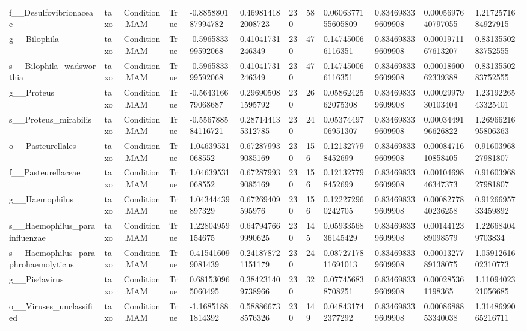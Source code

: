 \begin{longtable}{llllllllllll}
f\_\_Desulfovibrionaceae & taxo & Condition.MAM & True & -0.885880187994782 & 0.469814182008723 & 230 & 58 & 0.0606377155605809 & 0.834698339609908 & 0.0005697640797055 & 1.2172571684927915 \\
g\_\_Bilophila & taxo & Condition.MAM & True & -0.596583399592068 & 0.41041731246349 & 230 & 47 & 0.147450066116351 & 0.834698339609908 & 0.0001971167613207 & 0.8313550283752555 \\
s\_\_Bilophila\_wadsworthia & taxo & Condition.MAM & True & -0.596583399592068 & 0.41041731246349 & 230 & 47 & 0.147450066116351 & 0.834698339609908 & 0.0001860062339388 & 0.8313550283752555 \\
g\_\_Proteus & taxo & Condition.MAM & True & -0.564316679068687 & 0.296905081595792 & 230 & 26 & 0.0586242562075308 & 0.834698339609908 & 0.0002997930103404 & 1.2319226543325401 \\
s\_\_Proteus\_mirabilis & taxo & Condition.MAM & True & -0.556788584116721 & 0.287144135312785 & 230 & 24 & 0.0537449706951307 & 0.834698339609908 & 0.0003449196626822 & 1.2696621695806363 \\
o\_\_Pasteurellales & taxo & Condition.MAM & True & 1.04639531068552 & 0.672879939085169 & 230 & 156 & 0.121327798452699 & 0.834698339609908 & 0.0008471610858405 & 0.9160396827981807 \\
f\_\_Pasteurellaceae & taxo & Condition.MAM & True & 1.04639531068552 & 0.672879939085169 & 230 & 156 & 0.121327798452699 & 0.834698339609908 & 0.0010469846347373 & 0.9160396827981807 \\
g\_\_Haemophilus & taxo & Condition.MAM & True & 1.04344439897329 & 0.67269409595976 & 230 & 156 & 0.122272960242705 & 0.834698339609908 & 0.0008277840236258 & 0.9126695733459892 \\
s\_\_Haemophilus\_parainfluenzae & taxo & Condition.MAM & True & 1.22804959154675 & 0.647947669990625 & 230 & 145 & 0.0593356836145429 & 0.834698339609908 & 0.0014412389098579 & 1.226684049703834 \\
s\_\_Haemophilus\_paraphrohaemolyticus & taxo & Condition.MAM & True & 0.415416099081439 & 0.241878721151179 & 230 & 24 & 0.0872717811691013 & 0.834698339609908 & 0.0001327789138075 & 1.0591261602310773 \\
g\_\_Pis4avirus & taxo & Condition.MAM & True & 0.681530965060495 & 0.384231409738966 & 230 & 32 & 0.077456838708251 & 0.834698339609908 & 0.000285361198365 & 1.1109402321056685 \\
o\_\_Viruses\_unclassified & taxo & Condition.MAM & True & -1.16851881814392 & 0.588866738576326 & 230 & 149 & 0.048431742377292 & 0.834698339609908 & 0.0008688853340038 & 1.3148699065216711 \\

\end{longtable}
